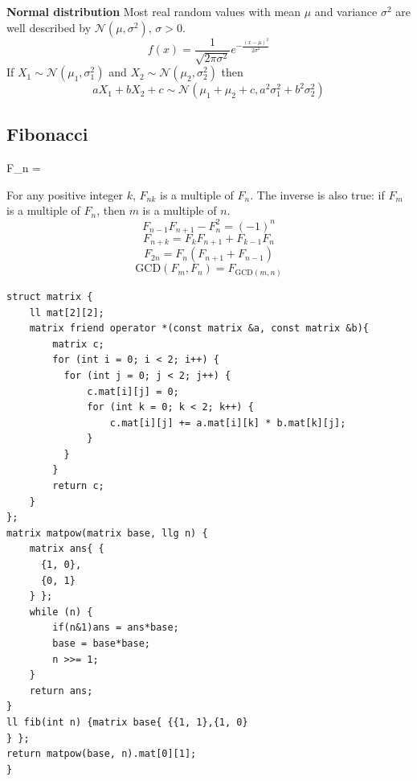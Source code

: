 \documentclass[a4paper,11pt,oneside]{article}
\begin{document}
\begin{multicols*}{\COLS}
\textbf{\small Normal distribution}
Most real random values with mean $\mu$ and variance $\sigma^2$ are well described by $\mathcal{N}(\mu,\sigma^2),\,\sigma>0$.
\[ f(x) = \frac{1}{\sqrt{2\pi\sigma^2}}e^{-\frac{(x-\mu)^2}{2\sigma^2}} \]
If $X_1 \sim \mathcal{N}(\mu_1,\sigma_1^2)$ and $X_2 \sim \mathcal{N}(\mu_2,\sigma_2^2)$ then
\[ aX_1 + bX_2 + c \sim \mathcal{N}(\mu_1+\mu_2+c,a^2\sigma_1^2+b^2\sigma_2^2) \]
\subsection{\small Fibonacci}

F_n = 

For any positive integer \(k\), \(F_{nk}\) is a multiple of \(F_n\). The inverse is also true: if \(F_m\) is a multiple of \(F_n\), then \(m\) is a multiple of \(n\).
    \[F_{n-1} F_{n+1} - F_n^2 = (-1)^n\]
    \[F_{n+k} = F_k F_{n+1} + F_{k-1} F_n\]
    \[F_{2n} = F_n (F_{n+1} + F_{n-1})\]
    \[\text{GCD}(F_m, F_n) = F_{\text{GCD}(m, n)}\]
\begin{lstlisting}
struct matrix {
    ll mat[2][2];
    matrix friend operator *(const matrix &a, const matrix &b){
        matrix c;
        for (int i = 0; i < 2; i++) {
          for (int j = 0; j < 2; j++) {
              c.mat[i][j] = 0;
              for (int k = 0; k < 2; k++) {
                  c.mat[i][j] += a.mat[i][k] * b.mat[k][j];
              }
          }
        }
        return c;
    }
};
matrix matpow(matrix base, llg n) {
    matrix ans{ {
      {1, 0},
      {0, 1}
    } };
    while (n) {
        if(n&1)ans = ans*base;
        base = base*base;
        n >>= 1;
    }
    return ans;
}
ll fib(int n) {matrix base{ {{1, 1},{1, 0}
} };
return matpow(base, n).mat[0][1];
}
\end{lstlisting}

\end{multicols*}

\end{document}
